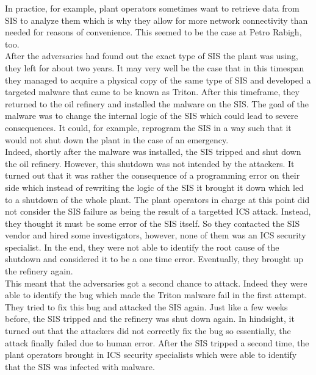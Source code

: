 \documentclass[runningheads]{llncs}
\begin{document}
In practice, for example, plant operators sometimes want to retrieve data from SIS to analyze them which is why they allow for more network connectivity than needed for reasons of convenience.
This seemed to be the case at Petro Rabigh, too. %
\cite{dragos.17}\\
After the adversaries had found out the exact type of SIS the plant was using, they left for about two years.
It may very well be the case that in this timespan they managed to acquire a physical copy of the same type of SIS and developed a targeted malware that came to be known as Triton.
After this timeframe, they returned to the oil refinery and installed the malware on the SIS.
The goal of the malware was to change the internal logic of the SIS which could lead to severe consequences.
It could, for example, reprogram the SIS in a way such that it would not shut down the plant in the case of an emergency. \cite{lee.20}\\
Indeed, shortly after the malware was installed, the SIS tripped and shut down the oil refinery.
However, this shutdown was not intended by the attackers.
It turned out that it was rather the consequence of a programming error on their side which instead of rewriting the logic of the SIS it brought it down which led to a shutdown of the whole plant.
The plant operators in charge at this point did not consider the SIS failure as being the result of a targetted ICS attack.
Instead, they thought it must be some error of the SIS itself.
So they contacted the SIS vendor and hired some investigators, however, none of them was an ICS security specialist.
In the end, they were not able to identify the root cause of the shutdown and considered it to be a one time error.
Eventually, they brought up the refinery again. \cite{lee.20}\\
This meant that the adversaries got a second chance to attack.
Indeed they were able to identify the bug which made the Triton malware fail in the first attempt.
They tried to fix this bug and attacked the SIS again.
Just like a few weeks before, the SIS tripped and the refinery was shut down again.
In hindsight, it turned out that the attackers did not correctly fix the bug so essentially, the attack finally failed due to human error.
After the SIS tripped a second time, the plant operators brought in ICS security specialists which were able to identify that the SIS was infected with malware.
\end{document}
